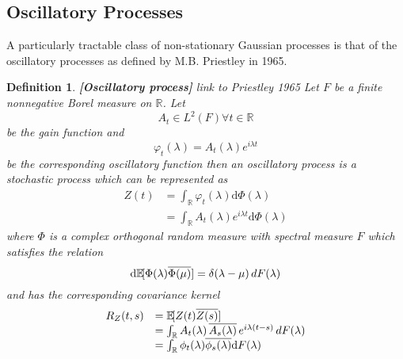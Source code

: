 \documentclass{article}
\newcommand{\mathd}{\mathrm{d}}
\newcommand{\tmem}[1]{{\em #1\/}}
\newcommand{\tmstrong}[1]{\textbf{#1}}
\newtheorem{definition}{Definition}
\begin{document}
\subsection{Oscillatory Processes}\label{sec:oscillatory}

A particularly tractable class of non-stationary Gaussian processes is that of
the oscillatory processes as defined by M.B. Priestley in
1965{\cite{evolutionarySpectraAndNonStationaryProcesses}}.

\begin{definition}
  {\tmstrong{[Oscillatory process]\label{def:osc_proc} }}link to Priestley
  1965 Let $F$ be a finite nonnegative Borel measure on $\mathbb{R}$. Let
  \begin{equation}
    A_t \in L^2 (F) \forall t \in \mathbb{R}
  \end{equation}
  be the gain function and
  \begin{equation}
    \varphi_t (\lambda) = A_t (\lambda) e^{i \lambda t} \label{of}
  \end{equation}
  be the corresponding oscillatory function then an {\tmem{oscillatory
  process}} is a stochastic process which can be represented as
  \begin{equation}
    \begin{array}{ll}
      Z (t) & = \int_{\mathbb{R}} \varphi_t (\lambda) \mathd \Phi (\lambda)\\
      & = \int_{\mathbb{R}} A_t (\lambda) e^{i \lambda t} \mathd \Phi
      (\lambda)
    \end{array}
  \end{equation}
  where $\Phi$ is a complex orthogonal random measure with spectral measure
  $F$ which satisfies the relation
  \begin{equation}
    \mathd \mathbb{E} \hspace{-0.17em} [\Phi (\lambda) \overline{\Phi (\mu)}]
    = \delta (\lambda - \mu)  \hspace{0.17em} dF (\lambda)
  \end{equation}
  and has the corresponding covariance kernel
  \begin{equation}
    \begin{array}{ll}
      R_Z (t, s) & =\mathbb{E} \hspace{-0.17em} [Z (t) \overline{Z (s)}]\\
      & = \int_{\mathbb{R}} A_t (\lambda) \hspace{0.17em} \overline{A_s
      (\lambda)} \hspace{0.17em} e^{i \lambda (t - s)}  \hspace{0.17em} dF
      (\lambda)\\
      & = \int_{\mathbb{R}} \phi_t (\lambda) \overline{\phi_s (\lambda)}
      \mathd F (\lambda)
    \end{array} \label{covar}
  \end{equation}
\end{definition}
\end{document}
